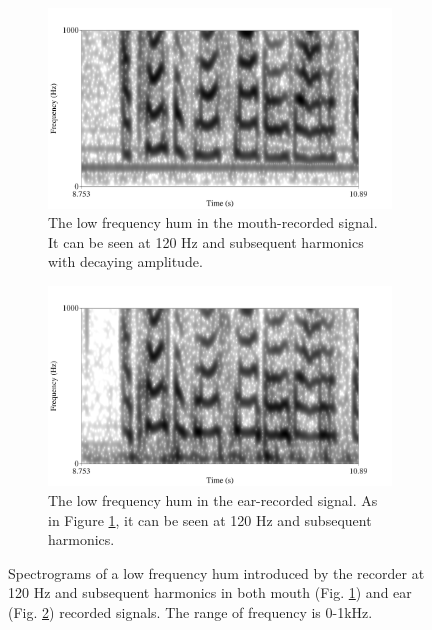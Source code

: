 \DIFdelbegin %
\DIFdelend \DIFaddbegin \begin{figure}[h!]
\DIFaddendFL \centering
\begin{subfigure}{0.475\textwidth}
  \centering
  \includegraphics[width=1\linewidth]{figure/low_frequency_hum.png}
  \caption{The low frequency hum in the mouth-recorded signal.  It can be seen at 120 Hz and subsequent harmonics with decaying amplitude.}
  \label{fig:low_freq_hum-mouth}
\end{subfigure}%
\hfill
\begin{subfigure}{0.475\textwidth}
  \centering
  \includegraphics[width=1\linewidth]{figure/low_frequency_hum-ear.png}
  \caption{The low frequency hum in the ear-recorded signal. As in Figure \ref{fig:low_freq_hum-mouth}, it can be seen at 120 Hz and subsequent harmonics.\DIFdelbeginFL {}\DIFdelendFL }
  \label{fig:low_freq_hum-ear}
\end{subfigure}
\caption{Spectrograms of a low frequency hum introduced by the recorder at 120 Hz and subsequent harmonics in both mouth (Fig. \ref{fig:low_freq_hum-mouth}) and ear (Fig. \ref{fig:low_freq_hum-ear}) recorded signals. The \DIFaddbeginFL {}\DIFaddendFL range of frequency is 0-1kHz.}
\label{fig:low_freq_hum}
\end{figure}

